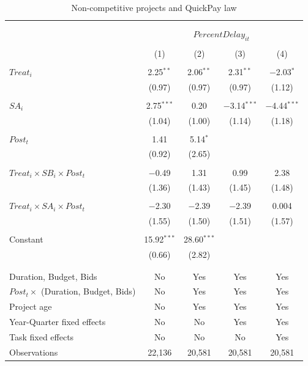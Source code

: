 \documentclass[
]{article}
\begin{document}
\begin{table}[H] \centering 
  \caption{Non-competitive projects and QuickPay law} 
  \label{} 
\small 
\begin{tabular}{@{\extracolsep{-2pt}}lcccc} 
\\[-1.8ex]\hline 
\hline \\[-1.8ex] 
\\[-1.8ex] & \multicolumn{4}{c}{$PercentDelay_{it}$  } \\ 
\\[-1.8ex] & (1) & (2) & (3) & (4)\\ 
\hline \\[-1.8ex] 
 $Treat_i$ & 2.25$^{**}$ & 2.06$^{**}$ & 2.31$^{**}$ & $-$2.03$^{*}$ \\ 
  & (0.97) & (0.97) & (0.97) & (1.12) \\ 
  & & & & \\ 
 $SA_i$ & 2.75$^{***}$ & 0.20 & $-$3.14$^{***}$ & $-$4.44$^{***}$ \\ 
  & (1.04) & (1.00) & (1.14) & (1.18) \\ 
  & & & & \\ 
 $Post_t$ & 1.41 & 5.14$^{*}$ &  &  \\ 
  & (0.92) & (2.65) &  &  \\ 
  & & & & \\ 
 $Treat_i \times SB_i \times Post_t$ & $-$0.49 & 1.31 & 0.99 & 2.38 \\ 
  & (1.36) & (1.43) & (1.45) & (1.48) \\ 
  & & & & \\ 
 $Treat_i \times SA_i \times Post_t$ & $-$2.30 & $-$2.39 & $-$2.39 & 0.004 \\ 
  & (1.55) & (1.50) & (1.51) & (1.57) \\ 
  & & & & \\ 
 Constant & 15.92$^{***}$ & 28.60$^{***}$ &  &  \\ 
  & (0.66) & (2.82) &  &  \\ 
  & & & & \\ 
\hline \\[-1.8ex] 
Duration, Budget, Bids & No & Yes & Yes & Yes \\ 
$Post_t \times $  (Duration, Budget, Bids) & No & Yes & Yes & Yes \\ 
Project age & No & Yes & Yes & Yes \\ 
Year-Quarter fixed effects & No & No & Yes & Yes \\ 
Task fixed effects & No & No & No & Yes \\ 
Observations & 22,136 & 20,581 & 20,581 & 20,581 \\ 

\end{tabular}
\end{table}
\end{document}

